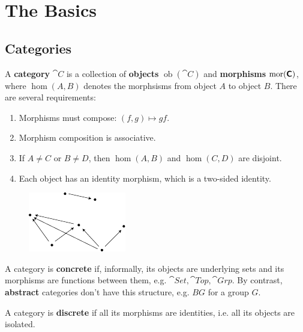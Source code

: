 \documentclass[twoside,10pt]{report}
\DeclareMathOperator{\ob}{ob}
\begin{document}
\tableofcontents


\chapter{The Basics}


\section{Categories}


\begin{defn}
	A \textbf{category} $\cat{C}$ is a collection of \textbf{objects} $\ob(\cat{C})$ and \textbf{morphisms} $\operatorname{mor}({\text{\sffamily\textbf{C}} })$, where $\hom(A,B)$ denotes the morphsisms from object $A$ to object $B$. There are several requirements:
	\begin{enumerate}
		\item Morphisms must compose: $(f, g) \mapsto gf.$
		\item Morphism composition is associative.
		\item If $A \neq C$ or $B \neq D$, then $\hom(A,B)$ and $\hom(C,D)$ are disjoint.
		\item Each object has an identity morphism, which is a two-sided identity.
	\end{enumerate}
\end{defn}
\begin{figure}[H]
	\centering
	\includegraphics[scale=1.4]{fig/category.pdf}
\end{figure}

A category is \textbf{concrete} if, informally, its objects are underlying sets and its morphisms are functions between them, e.g. $\cat{Set} , \cat{Top} , \cat{Grp} $. By contrast, \textbf{abstract} categories don't have this structure, e.g. $BG$ for a group $G$.

A category is \textbf{discrete} if all its morphisms are identities, i.e. all its objects are isolated.
\end{document}
